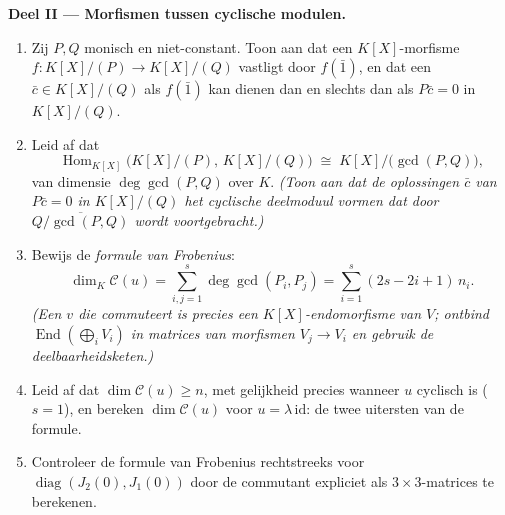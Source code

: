 \begin{problem}
\medskip
\noindent\textbf{Deel II --- Morfismen tussen cyclische modulen.}
\begin{enumerate}[resume]
  \item Zij $P, Q$ monisch en niet-constant. Toon aan dat een
        $K[X]$-morfisme $f \colon K[X]/(P) \to K[X]/(Q)$ vastligt
        door $f(\bar 1)$, en dat een $\bar c \in K[X]/(Q)$ als
        $f(\bar 1)$ kan dienen dan en slechts dan als $P\bar c = 0$
        in $K[X]/(Q)$.
  \item Leid af dat
        \[
        \operatorname{Hom}_{K[X]}\bigl(K[X]/(P),\, K[X]/(Q)\bigr)
        \;\cong\; K[X]\big/\bigl(\gcd(P, Q)\bigr),
        \]
        van dimensie $\deg \gcd(P, Q)$ over $K$. \emph{(Toon aan
        dat de oplossingen $\bar c$ van $P\bar c = 0$ in $K[X]/(Q)$
        het cyclische deelmoduul vormen dat door
        $\overline{Q/\gcd(P,Q)}$ wordt voortgebracht.)}
  \item Bewijs de \emph{formule van Frobenius}:
        \[
        \dim_K \mathcal C(u) = \sum_{i,j=1}^{s} \deg\gcd(P_i,
        P_j) = \sum_{i=1}^{s} (2s - 2i + 1)\, n_i .
        \]
        \emph{(Een $v$ die commuteert is precies een
        $K[X]$-endomorfisme van $V$; ontbind
        $\operatorname{End}(\bigoplus_i V_i)$ in matrices van
        morfismen $V_j \to V_i$ en gebruik de
        deelbaarheidsketen.)}
  \item Leid af dat $\dim \mathcal C(u) \geq n$, met gelijkheid
        precies wanneer $u$ cyclisch is ($s = 1$), en bereken
        $\dim\mathcal C(u)$ voor $u = \lambda\,\mathrm{id}$: de
        twee uitersten van de formule.
  \item Controleer de formule van Frobenius rechtstreeks voor
        $\operatorname{diag}(J_2(0), J_1(0))$ door de commutant
        expliciet als $3\times3$-matrices te berekenen.
\end{enumerate}


\end{problem}
